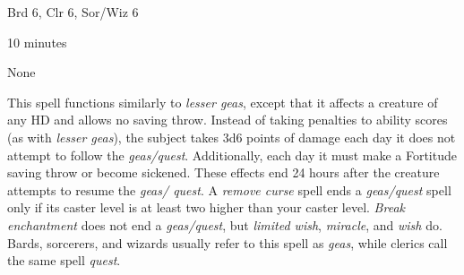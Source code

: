 
\begin{description*}
\item[Level:] Brd 6, Clr 6, Sor/Wiz 6
\item[Casting Time:] 10 minutes
\item[Saving Throw:] None
\end{description*}

This spell functions similarly to \textit{lesser geas}, except that it affects
a creature of any HD and allows no saving throw.
Instead of taking penalties to ability scores (as with \textit{lesser geas}), the
subject takes 3d6 points of damage each day it does not attempt to follow the \textit{geas/quest}.
Additionally, each day it must make a Fortitude saving throw or become sickened.
These effects end 24 hours after the creature attempts to resume the \textit{geas/
quest}.
A \textit{remove curse} spell ends a \textit{geas/quest} spell only if its caster
level is at least two higher than your caster level. \textit{Break enchantment
}does not end a \textit{geas/quest}, but \textit{limited wish}, \textit{miracle},
and \textit{wish} do.
Bards, sorcerers, and wizards usually refer to this spell as \textit{geas}, while
clerics call the same spell \textit{quest}.
